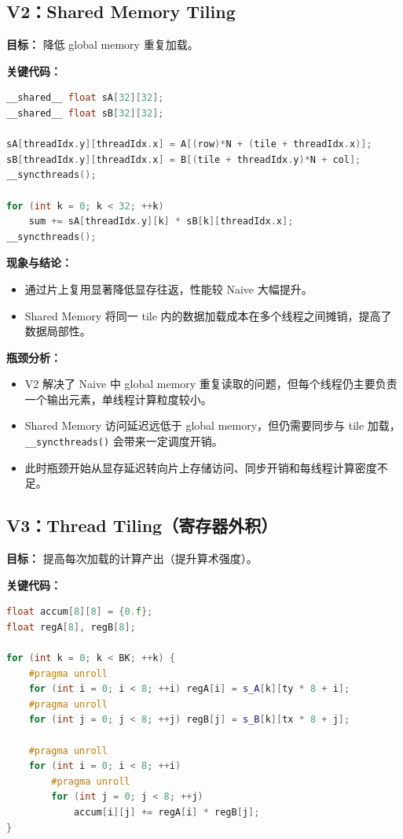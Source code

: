 \documentclass[12pt,a4paper]{ctexart}
\begin{document}
\subsection{V2：Shared Memory Tiling}
\textbf{目标：} 降低 global memory 重复加载。

\textbf{关键代码：}
\begin{lstlisting}[language=C++]
__shared__ float sA[32][32];
__shared__ float sB[32][32];

sA[threadIdx.y][threadIdx.x] = A[(row)*N + (tile + threadIdx.x)];
sB[threadIdx.y][threadIdx.x] = B[(tile + threadIdx.y)*N + col];
__syncthreads();

for (int k = 0; k < 32; ++k)
    sum += sA[threadIdx.y][k] * sB[k][threadIdx.x];
__syncthreads();
\end{lstlisting}

\textbf{现象与结论：}
\begin{itemize}[leftmargin=2em]
  \item 通过片上复用显著降低显存往返，性能较 Naive 大幅提升。
  \item Shared Memory 将同一 tile 内的数据加载成本在多个线程之间摊销，提高了数据局部性。
\end{itemize}

\textbf{瓶颈分析：}
\begin{itemize}[leftmargin=2em]
  \item V2 解决了 Naive 中 global memory 重复读取的问题，但每个线程仍主要负责一个输出元素，单线程计算粒度较小。
  \item Shared Memory 访问延迟远低于 global memory，但仍需要同步与 tile 加载，\texttt{\_\_syncthreads()} 会带来一定调度开销。
  \item 此时瓶颈开始从显存延迟转向片上存储访问、同步开销和每线程计算密度不足。
\end{itemize}

\subsection{V3：Thread Tiling（寄存器外积）}
\textbf{目标：} 提高每次加载的计算产出（提升算术强度）。

\textbf{关键代码：}
\begin{lstlisting}[language=C++]
float accum[8][8] = {0.f};
float regA[8], regB[8];

for (int k = 0; k < BK; ++k) {
    #pragma unroll
    for (int i = 0; i < 8; ++i) regA[i] = s_A[k][ty * 8 + i];
    #pragma unroll
    for (int j = 0; j < 8; ++j) regB[j] = s_B[k][tx * 8 + j];

    #pragma unroll
    for (int i = 0; i < 8; ++i)
        #pragma unroll
        for (int j = 0; j < 8; ++j)
            accum[i][j] += regA[i] * regB[j];
}
\end{lstlisting}
\end{document}
